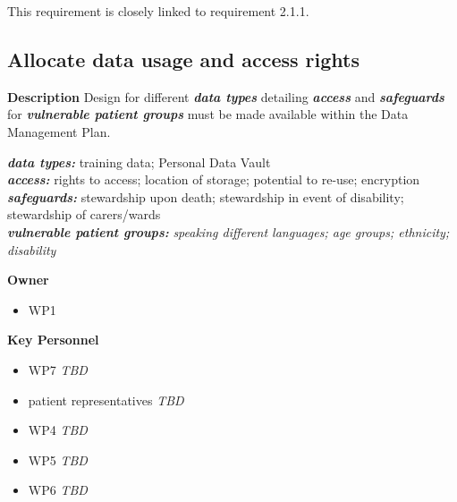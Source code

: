 \documentclass[
  letterpaper,
  DIV=11,
  numbers=noendperiod]{scrreport}
\providecommand{\tightlist}{%
  \setlength{\itemsep}{0pt}\setlength{\parskip}{0pt}}\usepackage{longtable,booktabs,array}
\begin{document}
\begin{tcolorbox}[enhanced jigsaw, arc=.35mm, breakable, coltitle=black, toptitle=1mm, colbacktitle=quarto-callout-note-color!10!white, toprule=.15mm, left=2mm, bottomrule=.15mm, opacitybacktitle=0.6, titlerule=0mm, colback=white, opacityback=0, title=\textcolor{quarto-callout-note-color}{\faInfo}\hspace{0.5em}{Note}, bottomtitle=1mm, colframe=quarto-callout-note-color-frame, leftrule=.75mm, rightrule=.15mm]

This requirement is closely linked to requirement 2.1.1.

\end{tcolorbox}

\hypertarget{allocate-data-usage-and-access-rights}{%
\subsection{Allocate data usage and access
rights}\label{allocate-data-usage-and-access-rights}}

\textbf{Description} Design for different \textbf{\emph{data types}}
detailing \textbf{\emph{access}} and \textbf{\emph{safeguards}} for
\textbf{\emph{vulnerable patient groups}} must be made available within
the Data Management Plan.

\textbf{\emph{data types:}} training data; Personal Data Vault\\
\textbf{\emph{access:}} rights to access; location of storage; potential
to re-use; encryption\\
\textbf{\emph{safeguards:}} stewardship upon death; stewardship in event
of disability; stewardship of carers/wards\\
\textbf{\emph{vulnerable patient groups:}} \emph{speaking different
languages; age groups; ethnicity; disability}

\textbf{Owner}

\begin{itemize}
\tightlist
\item
  WP1
\end{itemize}

\textbf{Key Personnel}

\begin{itemize}
\tightlist
\item
  WP7 \emph{TBD}
\item
  patient representatives \emph{TBD}
\item
  WP4 \emph{TBD}
\item
  WP5 \emph{TBD}
\item
  WP6 \emph{TBD}
\end{itemize}
\end{document}
